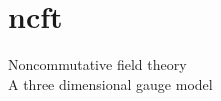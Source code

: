 \documentclass[9pt]{beamer}
\begin{document}
\section{ncft}

{
\begin{frame}
\bf
\begin{exampleblock}{\vspace*{-3ex}}
\begin{center}
\Large Noncommutative field theory \\ A three dimensional gauge model
\end{center}
\end{exampleblock}
\end{frame}
}

\end{document}

